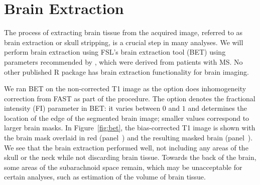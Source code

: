 \section{Brain Extraction}
The process of extracting brain tissue from the acquired image, referred to as brain extraction or skull stripping, is a crucial step in many analyses.  We will perform brain extraction using FSL's brain extraction tool (BET) \citep{smith_fast_2002, jenkinson_bet2:_2005} using parameters recommended by \citet{popescu_optimizing_2012}, which were derived from patients with MS.  No other published R package has brain extraction functionality for brain imaging.  
 


\begin{knitrout}
\color{fgcolor}\begin{kframe}
\begin{alltt}
\hlstd{(} \hlstd{=}  \hlstd{,}
        \hlstd{=} \hlstd{,}
        \hlstd{=} \hlstd{,}  
        \hlstd{=} \hlstd{,}
       \hlstd{=}\hlstd{)}
\end{alltt}
\end{kframe}
\end{knitrout}


We ran BET on the non-corrected T1 image as the  option does inhomogeneity correction from FAST as part of the procedure.  The option  denotes the fractional intensity (FI) parameter in BET: it varies between $0$ and $1$ and determines the location of the edge of the segmented brain image; smaller values correspond to larger brain masks. In Figure~\ref{fig:bet}, the bias-corrected T1 image is shown with the brain mask overlaid in red (panel~\protect{}) and the resulting masked brain (panel~\protect{}).  We see that the brain extraction performed well, not including any areas of the skull or the neck while not discarding brain tissue.  Towards the back of the brain, some areas of the subarachnoid space remain, which may be unacceptable for certain analyses, such as estimation of the volume of brain tissue.



